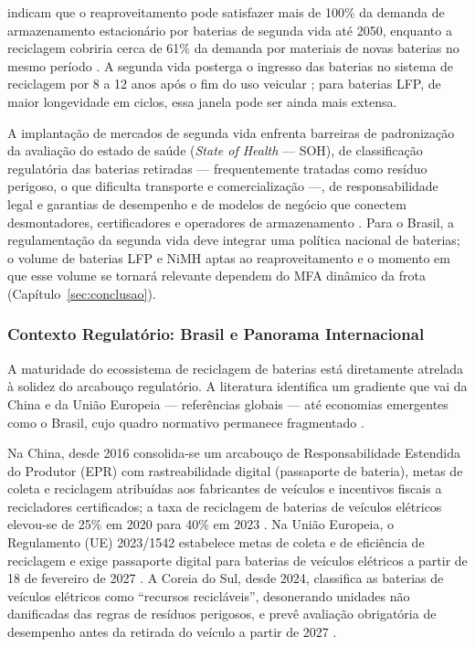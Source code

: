  indicam que o reaproveitamento pode satisfazer mais de
100\% da demanda de armazenamento estacionário por baterias de segunda vida até
2050, enquanto a reciclagem cobriria cerca de 61\% da demanda por materiais de
novas baterias no mesmo período \cite{est2025}. A segunda vida posterga o ingresso
das baterias no sistema de reciclagem por 8 a 12 anos após o fim do uso veicular
\cite{mdpisustain2024}; para baterias LFP, de maior longevidade em ciclos, essa
janela pode ser ainda mais extensa.

A implantação de mercados de segunda vida enfrenta barreiras de padronização da
avaliação do estado de saúde (\textit{State of Health} — SOH), de classificação
regulatória das baterias retiradas — frequentemente tratadas como resíduo
perigoso, o que dificulta transporte e comercialização —, de responsabilidade
legal e garantias de desempenho e de modelos de negócio que conectem
desmontadores, certificadores e operadores de armazenamento \cite{moseley2019}.
Para o Brasil, a regulamentação da segunda vida deve integrar uma política
nacional de baterias; o volume de baterias LFP e NiMH aptas ao reaproveitamento e
o momento em que esse volume se tornará relevante dependem do MFA dinâmico da
frota (Capítulo~\ref{sec:conclusao}).

\subsubsection{Contexto Regulatório: Brasil e Panorama Internacional}
\label{subsec:regulatorio}

A maturidade do ecossistema de reciclagem de baterias está diretamente atrelada à
solidez do arcabouço regulatório. A literatura identifica um gradiente que vai da
China e da União Europeia — referências globais — até economias emergentes como o
Brasil, cujo quadro normativo permanece fragmentado \cite{regulationsmdpi2025}.

Na China, desde 2016 consolida-se um arcabouço de Responsabilidade Estendida do
Produtor (EPR) com rastreabilidade digital (passaporte de bateria), metas de
coleta e reciclagem atribuídas aos fabricantes de veículos e incentivos fiscais a
recicladores certificados; a taxa de reciclagem de baterias de veículos elétricos
elevou-se de 25\% em 2020 para 40\% em 2023 \cite{miit2024}. Na União Europeia, o
Regulamento (UE) 2023/1542 estabelece metas de coleta e de eficiência de
reciclagem e exige passaporte digital para baterias de veículos elétricos a
partir de 18 de fevereiro de 2027 \cite{eu2023battery}. A Coreia do Sul, desde
2024, classifica as baterias de veículos elétricos como ``recursos recicláveis'',
desonerando unidades não danificadas das regras de resíduos perigosos, e prevê
avaliação obrigatória de desempenho antes da retirada do veículo a partir de 2027
\cite{regulationsmdpi2025}.

